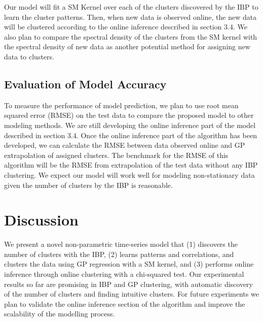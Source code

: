 \documentclass{article}
\begin{document}
Our model will fit a SM Kernel over each of the clusters discovered by the IBP to learn the cluster patterns. Then, when new data is observed online, the new data will be clustered according to the online inference described in section 3.4. We also plan to compare the spectral density of the clusters from the SM kernel with the spectral density of new data as another potential method for assigning new data to clusters.

\subsection{Evaluation of Model Accuracy}

To measure the performance of model prediction, we plan to use root mean squared error (RMSE) on the test data to compare the proposed model to other modeling methods. We are still developing the online inference part of the model described in section 3.4. Once the online inference part of the algorithm has been developed, we can calculate the RMSE between data observed online and GP extrapolation of assigned clusters. The benchmark for the RMSE of this algorithm will be the RMSE from extrapolation of the test data without any IBP clustering. We expect our model will work well for modeling non-stationary data given the number of clusters by the IBP is reasonable. 

\section{Discussion}

We present a novel non-parametric time-series model that (1) discovers the number of clusters with the IBP, (2) learns patterns and correlations, and clusters the data using GP regression with a SM kernel, and (3) performs online inference through online clustering with a chi-squared test. Our experimental results so far are promising in IBP and GP clustering, with automatic discovery of the number of clusters and finding intuitive clusters. For future experiments we plan to validate the online inference section of the algorithm and improve the scalability of the modelling process.



\end{document}
